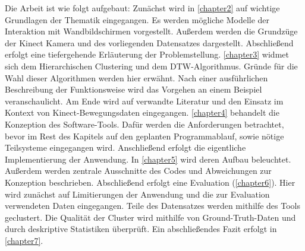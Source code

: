 Die Arbeit ist wie folgt aufgebaut:
Zunächst wird in \autoref{chapter2} auf wichtige Grundlagen der Thematik eingegangen.
Es werden mögliche Modelle der Interaktion mit Wandbildschirmen vorgestellt.
Außerdem werden die Grundzüge der Kinect Kamera und des vorliegenden Datensatzes dargestellt.
Abschließend erfolgt eine tiefergehende Erläuterung der Problemstellung.
\autoref{chapter3} widmet sich dem Hierarchischen Clustering und dem \ac{DTW}-Algorithmus.
Gründe für die Wahl dieser Algorithmen werden hier erwähnt.
Nach einer ausführlichen Beschreibung der Funktionsweise
wird das Vorgehen an einem Beispiel veranschaulicht.
Am Ende wird auf verwandte Literatur
und den Einsatz im Kontext von Kinect-Bewegungsdaten eingegangen.
\autoref{chapter4} behandelt die Konzeption des Software-Tools.
Dafür werden die Anforderungen betrachtet,
bevor im Rest des Kapitels auf den geplanten Programmablauf,
sowie nötige Teilsysteme eingegangen wird.
Anschließend erfolgt die eigentliche Implementierung der Anwendung.
In \autoref{chapter5} wird deren Aufbau beleuchtet.
Außerdem werden zentrale Ausschnitte des Codes
und Abweichungen zur Konzeption beschrieben.
Abschließend erfolgt eine Evaluation (\autoref{chapter6}).
Hier wird zunächst auf Limitierungen der Anwendung
und die zur Evaluation verwendeten Daten eingegangen.
Teile des Datensatzes werden mithilfe des Tools geclustert.
Die Qualität der Cluster wird mithilfe von Ground-Truth-Daten
und durch deskriptive Statistiken überprüft.
Ein abschließendes Fazit erfolgt in \autoref{chapter7}.